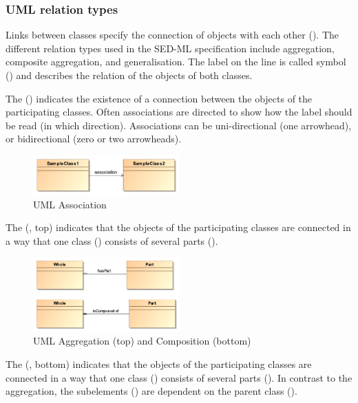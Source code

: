 \subsubsection{UML relation types}
Links between classes specify the connection of objects with each other (). The different relation types used in the SED-ML specification include aggregation, composite aggregation, and generalisation. The label on the line is called symbol () and describes the relation of the objects of both classes. 

The  () indicates the existence of a connection between the objects of the participating classes. Often associations are directed to show how the label should be read (in which direction). Associations can be uni-directional (one arrowhead), or bidirectional (zero or two arrowheads).
  
\begin{figure}[h]
	\centering
	\includegraphics[width=0.5\textwidth]{images/pdf/umlAssociation}
	\caption{UML Association}
	\label{fig:umlAssociation}
\end{figure}


The  (, top) indicates that the objects of the participating classes are connected in a way that one class () consists of several parts ().

\begin{figure}[h]
	\centering
	\includegraphics[width=0.5\textwidth]{images/pdf/umlAggregation}
	\caption{UML Aggregation (top) and Composition (bottom)}
	\label{fig:umlAggregation}
\end{figure}


The  (, bottom) indicates that the objects of the participating classes are connected in a way that one class () consists of several parts (). In contrast to the aggregation, the subelements () are dependent on the parent class ().


